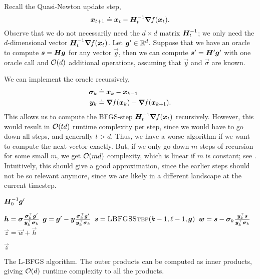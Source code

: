 Recall the Quasi-Newton update step, \[
    \bm{x}_{t+1} \doteq \bm{x}_t - \bm{H}^{-1}_t \bm{\nabla}_{\! } f(\bm{x}_t).
\]
Observe that we do not necessarily need the $d \times d$ matrix $\bm{H}^{-1}_t$; we only need the
$d$-dimensional vector $\bm{H}^{-1}_t \bm{\nabla}_{\! } f(\bm{x}_t)$. Let $\bm{g}' \in \mathbb{R}^d$. Suppose
that we have an oracle to compute $\bm{s} = \bm{H} \bm{g}$ for any vector $\vec{g}$, then we can
compute $\bm{s}' = \bm{H}' \bm{g}'$ with one oracle call and $\bigo{d}$ additional operations,
assuming that $\vec{y}$ and $\vec{\sigma}$ are known.

We can implement the oracle recursively,
\begin{align*}
    \bm{\sigma}_k & \doteq \bm{x}_k - \bm{x}_{k-1}                          \\
    \bm{y}_k      & \doteq \bm{\nabla}_{\! } f(\bm{x}_k) - \bm{\nabla}_{\! } f(\bm{x}_{k+1}).
\end{align*}
This allows us to compute the BFGS-step $\bm{H}^{-1}_t \bm{\nabla}_{\! } f(\bm{x}_t)$ recursively. However,
this would result in $\bigo{td}$ runtime complexity per step, since we would have to go down all
steps, and generally $t > d$. Thus, we have a worse algorithm if we want to compute the next vector
exactly. But, if we only go down $m$ steps of recursion for some small $m$, we get $\bigo{md}$
complexity, which is linear if $m$ is constant; see . Intuitively, this should give
a good approximation, since the earlier steps should not be so relevant anymore, since we are likely
in a different landscape at the current timestep.

\begin{algorithm}
    \begin{algorithmic}
        \State \Return $\bm{H}^{-1}_0 \bm{g}'$
        \EndIf

        \State $\bm{h} = \bm{\sigma} \frac{\bm{\sigma}_k^\top \bm{g}'}{\bm{y}_k^\top \bm{\sigma}_k}$
        \State $\bm{g} = \bm{g}' - \bm{y} \frac{\bm{\sigma}_k^\top \bm{g}'}{\bm{y}_k^\top \bm{\sigma}_k}$
        \State $\vec{s} = \Call{LBFGSStep}{k-1, \ell - 1, \vec{g}}$
        \State $\bm{w} = \bm{s} - \bm{\sigma}_k \frac{\bm{y}_k^\top \bm{s}}{\bm{y}_k^\top \bm{\sigma}_k}$
        \State $\vec{z} = \vec{w} + \vec{h}$

        \State \Return $\vec{z}$
        \EndFunction
    \end{algorithmic}
    \caption{The L-BFGS algorithm. The outer products can be computed as inner products, giving $\bigo{d}$ runtime complexity to all the products.}
    \label{alg:l-bfgs}
\end{algorithm}

